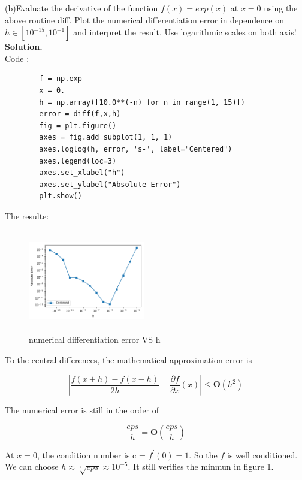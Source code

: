 \documentclass{article}
\begin{document}
\indent (b)Evaluate the derivative of the function $f(x) = exp(x)$ at $x = 0 $ using the above routine diff. Plot the numerical differentiation error in dependence on $ h  \in  [10^{-15},10^{-1}]$  and interpret the result. Use logarithmic scales on both axis!
\textbf{Solution.}\\
Code :
    \begin{lstlisting}
        f = np.exp
        x = 0.
        h = np.array([10.0**(-n) for n in range(1, 15)])
        error = diff(f,x,h)
        fig = plt.figure()
        axes = fig.add_subplot(1, 1, 1)
        axes.loglog(h, error, 's-', label="Centered")
        axes.legend(loc=3)
        axes.set_xlabel("h")
        axes.set_ylabel("Absolute Error")
        plt.show()
    \end{lstlisting}
The resulte:
  \begin{figure}[H]            \centering\includegraphics[width=2in,height=1.75in]{output_2.png}
	\caption{numerical differentiation error  VS  h}
	\label{fig:graph}
  \end{figure}


To the central differences, the mathematical approximation error is 

  

       $$\left| \frac{f(x+h)-f(x-h)}{2h}-\frac{\partial f}{\partial x}(x)\right| \leqslant \textbf{O}(h^{2}) $$

 The numerical error is still in the order of 

        $$ \frac{eps}{h} = \textbf{O}(\frac{eps}{h}) $$

 At $x=0$, the condition number is c = $f^{'}(0)=1$. So the $f$ is well conditioned. We can choose $h \approx \sqrt[3]{eps}\approx 10^{-5}$. It still verifies the minmun in figure 1.
\end{document}
